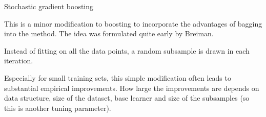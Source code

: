 \begin{vbframe}{Stochastic gradient boosting}

This is a minor modification to boosting to incorporate the advantages of bagging into the method.
The idea was formulated quite early by Breiman.

\lz

Instead of fitting on all the data points, a random subsample is drawn in each iteration.

\lz

Especially for small training sets, this simple modification often leads to
substantial empirical improvements.
How large the improvements are depends on data structure, size of the dataset,
base learner and size of the subsamples (so this is another tuning parameter).


\end{vbframe}















